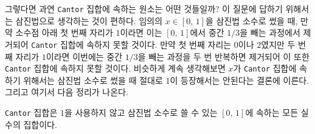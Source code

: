 그렇다면 과연 \texttt{Cantor} 집합에 속하는 원소는 어떤 것들일까? 이 질문에 답하기 위해서는 삼진법으로 생각하는 것이 편하다. 임의의 $x\in[0,\,1]$을 삼진법 소수로 썼을 때, 만약 소수점 아래 첫 번째 자리가 $1$이라면 이는 $[0,\,1]$에서 중간 $1/3$을 빼는 과정에서 제거되어 \texttt{Cantor} 집합에 속하지 못할 것이다. 만약 첫 번째 자리는 $0$이나 $2$였지만 두 번째 자리가 $1$이라면 이번에는 중간 $1/3$을 빼는 과정을 두 번 반복하면 제거되어 이 또한 \texttt{Cantor} 집합에 속하지 못할 것이다. 비슷하게 계속 생각해보면 $x$가 \texttt{Cantor} 집합에 속하기 위해서는 삼진법 소수로 썼을 때 절대로 $1$이 등장해서는 안된다는 결론에 이른다. 그리고 여기서 다음 정리가 나온다.

\begin{theorem}\label{thm:cantorDigit}
    \texttt{Cantor} 집합은 $1$을 사용하지 않고 삼진법 소수로 쓸 수 있는 $[0,\,1]$에 속하는 모든 실수의 집합이다.
\end{theorem}

